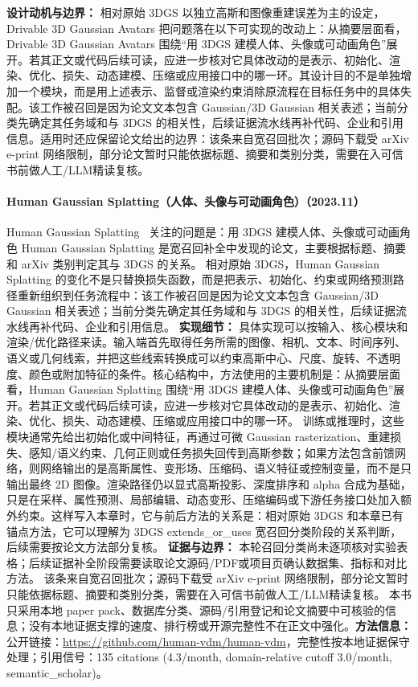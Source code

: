 \textbf{设计动机与边界：} 相对原始 3DGS 以独立高斯和图像重建误差为主的设定，Drivable 3D Gaussian Avatars 把问题落在以下可实现的改动上：从摘要层面看，Drivable 3D Gaussian Avatars 围绕“用 3DGS 建模人体、头像或可动画角色”展开。若其正文或代码后续可读，应进一步核对它具体改动的是表示、初始化、渲染、优化、损失、动态建模、压缩或应用接口中的哪一环。其设计目的不是单独增加一个模块，而是用上述表示、监督或渲染约束消除原流程在目标任务中的具体失配。该工作被召回是因为论文文本包含 Gaussian/3D Gaussian 相关表述；当前分类先确定其任务域和与 3DGS 的相关性，后续证据流水线再补代码、企业和引用信息。适用时还应保留论文给出的边界：该条来自宽召回批次；源码下载受 arXiv e-print 网络限制，部分论文暂时只能依据标题、摘要和类别分类，需要在入可信书前做人工/LLM精读复核。
\paragraph{Human Gaussian Splatting（人体、头像与可动画角色）（2023.11）}
Human Gaussian Splatting~\cite{2311_17113} 关注的问题是：用 3DGS 建模人体、头像或可动画角色 Human Gaussian Splatting 是宽召回补全中发现的论文，主要根据标题、摘要和 arXiv 类别判定其与 3DGS 的关系。
相对原始 3DGS，Human Gaussian Splatting 的变化不是只替换损失函数，而是把表示、初始化、约束或网络预测路径重新组织到任务流程中：该工作被召回是因为论文文本包含 Gaussian/3D Gaussian 相关表述；当前分类先确定其任务域和与 3DGS 的相关性，后续证据流水线再补代码、企业和引用信息。
\textbf{实现细节：} 具体实现可以按输入、核心模块和渲染/优化路径来读。输入端首先取得任务所需的图像、相机、文本、时间序列、语义或几何线索，并把这些线索转换成可以约束高斯中心、尺度、旋转、不透明度、颜色或附加特征的条件。核心结构中，方法使用的主要机制是：从摘要层面看，Human Gaussian Splatting 围绕“用 3DGS 建模人体、头像或可动画角色”展开。若其正文或代码后续可读，应进一步核对它具体改动的是表示、初始化、渲染、优化、损失、动态建模、压缩或应用接口中的哪一环。 训练或推理时，这些模块通常先给出初始化或中间特征，再通过可微 Gaussian rasterization、重建损失、感知/语义约束、几何正则或任务损失回传到高斯参数；如果方法包含前馈网络，则网络输出的是高斯属性、变形场、压缩码、语义特征或控制变量，而不是只输出最终 2D 图像。渲染路径仍以显式高斯投影、深度排序和 alpha 合成为基础，只是在采样、属性预测、局部编辑、动态变形、压缩编码或下游任务接口处加入额外约束。这样写入本章时，它与前后方法的关系是：相对原始 3DGS 和本章已有锚点方法，它可以理解为 3DGS extends\_or\_uses 宽召回分类阶段的关系判断，后续需要按论文方法部分复核。
\textbf{证据与边界：} 本轮召回分类尚未逐项核对实验表格；后续证据补全阶段需要读取论文源码/PDF或项目页确认数据集、指标和对比方法。 该条来自宽召回批次；源码下载受 arXiv e-print 网络限制，部分论文暂时只能依据标题、摘要和类别分类，需要在入可信书前做人工/LLM精读复核。 本书只采用本地 paper pack、数据库分类、源码/引用登记和论文摘要中可核验的信息；没有本地证据支撑的速度、排行榜或开源完整性不在正文中强化。\textbf{方法信息：} 公开链接：\url{https://github.com/human-vdm/human-vdm}，完整性按本地证据保守处理；引用信号：135 citations (4.3/month, domain-relative cutoff 3.0/month, semantic\_scholar)。
